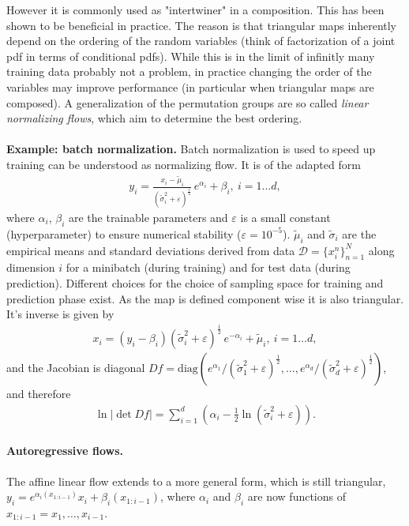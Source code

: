 \documentclass[12pt,a4paper]{article}
\begin{document}
However it is commonly used as "intertwiner" in a composition. This has been shown to be beneficial in practice. The reason is that triangular maps inherently depend on the ordering of the random variables (think of factorization of a joint pdf in terms of conditional pdfs). While this is in the limit of infinitly many training data probably not a problem, in practice changing the order of the variables may improve performance (in particular when triangular maps are composed). A generalization of the permutation groups are so called \textit{linear normalizing flows}, which aim to determine the best ordering.
\\ \\
\textbf{Example: batch normalization.} Batch normalization \cite{ioffe_2015_batch_normalization} is used to speed up training can be understood as normalizing flow. It is of the adapted form \cite{papamakarios_2017_maf}
\begin{align}
	y_i = \frac{x_i - \tilde \mu_i}{\left(\tilde \sigma_i^2 +  \varepsilon\right)^{\frac{1}{2}}} \, e^{\alpha_i} + \beta_i, ~ i=1\dots d, 
\end{align}
where $\alpha_i$, $\beta_i$ are the trainable parameters  and $\varepsilon$ is a small constant (hyperparameter) to ensure numerical stability ($\varepsilon=10^{-5}$).  $\tilde \mu_i$ and $\tilde \sigma_i$ are the empirical means and standard deviations derived from data $\mathcal D = \{x_i^{n}\}_{n=1}^N$ along dimension $i$ for a minibatch (during training) and for test data (during prediction).
Different choices for the choice of sampling space for training and prediction phase exist. As the map is defined component wise it is also triangular. It's inverse is given by
\begin{align}
x_i = \left(y_i - \beta_i\right) \left(\tilde \sigma_i^2 +  \varepsilon\right)^{\frac{1}{2}} \, e^{-\alpha_i} + \tilde \mu_i, ~ i=1\dots d, 
\end{align}
and the Jacobian is diagonal $Df = \text{diag}(e^{\alpha_1} /\left(\tilde \sigma_1^2 +  \varepsilon\right)^{\frac{1}{2}}, \dots, e^{\alpha_d} /\left(\tilde \sigma_d^2 +  \varepsilon\right)^{\frac{1}{2}}   )$, and therefore 
\begin{align}
	\ln |\det Df| = \sum_{i=1}^d \left( \alpha_i - \frac{1}{2}\ln\left(\tilde \sigma_i^2 +  \varepsilon\right)\right).
\end{align}

\paragraph{Autoregressive flows.}
The affine linear flow extends to a more general form, which is still triangular, $y_{i} = e^{\alpha_{i}(x_{1:i-1})} x_{i} + \beta_i(x_{1:i-1})$, where $\alpha_{i}$ and $\beta_{i}$ are now functions of $x_{1:i-1} = x_1, \dots, x_{i-1}$. 
\end{document}
